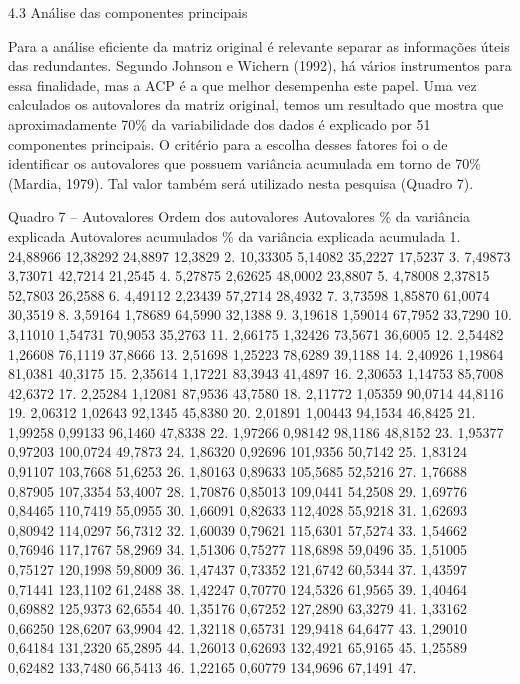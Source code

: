 4.3 Análise das componentes principais

Para a análise eficiente da matriz original  é relevante separar as informações úteis das redundantes. Segundo Johnson e Wichern (1992), há vários instrumentos para essa finalidade, mas a ACP é a que melhor desempenha este papel. 
Uma vez calculados os autovalores da matriz original, temos um resultado que mostra que aproximadamente 70\% da variabilidade dos dados é explicado por 51 componentes principais. O critério para a escolha desses fatores foi o de identificar os autovalores que possuem variância acumulada em torno de 70\% (Mardia, 1979). Tal valor também será utilizado nesta pesquisa (Quadro 7). 

 Quadro 7 – Autovalores
Ordem dos autovalores
Autovalores
\% da variância explicada
Autovalores acumulados
\% da variância explicada acumulada
1. 
24,88966
12,38292
24,8897
12,3829
2. 
10,33305
5,14082
35,2227
17,5237
3. 
7,49873
3,73071
42,7214
21,2545
4. 
5,27875
2,62625
48,0002
23,8807
5. 
4,78008
2,37815
52,7803
26,2588
6. 
4,49112
2,23439
57,2714
28,4932
7. 
3,73598
1,85870
61,0074
30,3519
8. 
3,59164
1,78689
64,5990
32,1388
9. 
3,19618
1,59014
67,7952
33,7290
10. 
3,11010
1,54731
70,9053
35,2763
11. 
2,66175
1,32426
73,5671
36,6005
12. 
2,54482
1,26608
76,1119
37,8666
13. 
2,51698
1,25223
78,6289
39,1188
14. 
2,40926
1,19864
81,0381
40,3175
15. 
2,35614
1,17221
83,3943
41,4897
16. 
2,30653
1,14753
85,7008
42,6372
17. 
2,25284
1,12081
87,9536
43,7580
18. 
2,11772
1,05359
90,0714
44,8116
19. 
2,06312
1,02643
92,1345
45,8380
20. 
2,01891
1,00443
94,1534
46,8425
21. 
1,99258
0,99133
96,1460
47,8338
22. 
1,97266
0,98142
98,1186
48,8152
23. 
1,95377
0,97203
100,0724
49,7873
24. 
1,86320
0,92696
101,9356
50,7142
25. 
1,83124
0,91107
103,7668
51,6253
26. 
1,80163
0,89633
105,5685
52,5216
27. 
1,76688
0,87905
107,3354
53,4007
28. 
1,70876
0,85013
109,0441
54,2508
29. 
1,69776
0,84465
110,7419
55,0955
30. 
1,66091
0,82633
112,4028
55,9218
31. 
1,62693
0,80942
114,0297
56,7312
32. 
1,60039
0,79621
115,6301
57,5274
33. 
1,54662
0,76946
117,1767
58,2969
34. 
1,51306
0,75277
118,6898
59,0496
35. 
1,51005
0,75127
120,1998
59,8009
36. 
1,47437
0,73352
121,6742
60,5344
37. 
1,43597
0,71441
123,1102
61,2488
38. 
1,42247
0,70770
124,5326
61,9565
39. 
1,40464
0,69882
125,9373
62,6554
40. 
1,35176
0,67252
127,2890
63,3279
41. 
1,33162
0,66250
128,6207
63,9904
42. 
1,32118
0,65731
129,9418
64,6477
43. 
1,29010
0,64184
131,2320
65,2895
44. 
1,26013
0,62693
132,4921
65,9165
45. 
1,25589
0,62482
133,7480
66,5413
46. 
1,22165
0,60779
134,9696
67,1491
47. 
